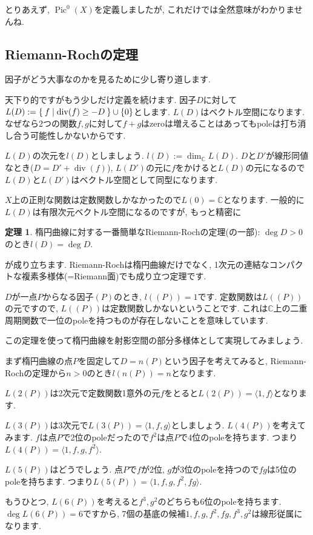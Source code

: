 \documentclass{jsarticle}
\newcommand{\CC}{\mathbb{C}}
\newcommand{\makeop}[1]{\mathop{\mathrm{#1}}\nolimits}
\def\Pic{\makeop{Pic}}
\def\div{\makeop{div}}
\theoremstyle{definition}
\newtheorem{theorem}{定理}
\numberwithin{theorem}{section}
\begin{document}
とりあえず, $\Pic^0(X)$を定義しましたが, これだけでは全然意味がわかりませんね.

\subsection{Riemann-Rochの定理}
因子がどう大事なのかを見るために少し寄り道します.

天下り的ですがもう少しだけ定義を続けます. 因子$D$に対して$L(D) := \Set{f | \div(f) \geq -D} \cup \{0\}$とします. $L(D)$はベクトル空間になります. なぜなら2つの関数$f, g$に対して$f+g$はzeroは増えることはあってもpoleは打ち消し合う可能性しかないからです.

$L(D)$の次元を$l(D)$としましょう. $l(D) := \dim_\CC L(D)$. $D$と$D'$が線形同値なとき($D = D' + \div(f)$), $L(D')$の元に$f$をかけると$L(D)$の元になるので$L(D)$と$L(D')$はベクトル空間として同型になります. 

$X$上の正則な関数は定数関数しかなかったので$L(0) = \CC$となります. 一般的に$L(D)$は有限次元ベクトル空間になるのですが, もっと精密に
\begin{theorem}
楕円曲線に対する一番簡単なRiemann-Rochの定理(の一部): $\deg D > 0$のとき$l(D) = \deg D$.
\end{theorem}
が成り立ちます. Riemann-Rochは楕円曲線だけでなく, 1次元の連結なコンパクトな複素多様体(=Riemann面)でも成り立つ定理です. 

$D$が一点$P$からなる因子$(P)$のとき, $l((P)) = 1$です. 定数関数は$L((P))$の元ですので, $L((P))$は定数関数しかないということです. これは$\CC$上の二重周期関数で一位のpoleを持つものが存在しないことを意味しています. 

この定理を使って楕円曲線を射影空間の部分多様体として実現してみましょう.

まず楕円曲線の点$P$を固定して$D = n(P)$という因子を考えてみると, Riemann-Rochの定理から$n > 0$のとき$l(n(P)) = n$となります.

$L(2(P))$は2次元で定数関数1意外の元$f$をとると$L(2(P)) = \langle1, f\rangle$となります. 

$L(3(P))$は3次元で$L(3(P)) = \langle1, f, g\rangle$としましょう. $L(4(P))$を考えてみます. $f$は点$P$で2位のpoleだったので$f^2$は点$P$で4位のpoleを持ちます. つまり$L(4(P)) = \langle1, f, g, f^2\rangle$.

$L(5(P))$はどうでしょう. 点$P$で$f$が2位, $g$が3位のpoleを持つので$fg$は5位のpoleを持ちます. つまり$L(5(P)) = \langle1, f, g, f^2, fg\rangle$.

もうひとつ, $L(6(P))$を考えると$f^3, g^2$のどちらも6位のpoleを持ちます. $\deg L(6(P)) = 6$ですから, 7個の基底の候補$1, f, g, f^2, fg, f^3, g^2$は線形従属になります.
\end{document}
